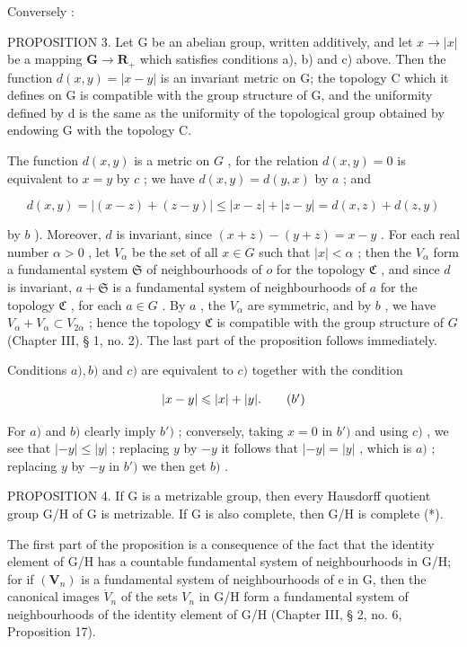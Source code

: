 Conversely :

PROPOSITION 3. Let G be an abelian group, written additively, and let \(x \to |x|\) be a mapping \(\mathbf{G} \to \mathbf{R}_+\) which satisfies conditions a), b) and c) above. Then the function \(d(x, y) = |x - y|\) is an invariant metric on G; the topology C which it defines on G is compatible with the group structure of G, and the uniformity defined by d is the same as the uniformity of the topological group obtained by endowing G with the topology C.

The function \(d(x, y)\) is a metric on \(G\) , for the relation \(d(x, y) = 0\) is equivalent to \(x = y\) by \(c\) ; we have \(d(x, y) = d(y, x)\) by \(a\) ; and

\[
d (x, y) = | (x - z) + (z - y) | \leqslant | x - z | + | z - y | = d (x, z) + d (z, y)
\]

by \(b\) ). Moreover, \(d\) is invariant, since \((x + z) - (y + z) = x - y\) . For each real number \(\alpha > 0\) , let \(V_{\alpha}\) be the set of all \(x \in G\) such that \(|x| < \alpha\) ; then the \(V_{\alpha}\) form a fundamental system \(\mathfrak{S}\) of neighbourhoods of \(o\) for the topology \(\mathfrak{C}\) , and since \(d\) is invariant, \(a + \mathfrak{S}\) is a fundamental system of neighbourhoods of \(a\) for the topology \(\mathfrak{C}\) , for each \(a \in G\) . By \(a\) , the \(V_{\alpha}\) are symmetric, and by \(b\) , we have \(V_{\alpha} + V_{\alpha} \subset V_{2\alpha}\) ; hence the topology \(\mathfrak{C}\) is compatible with the group structure of \(G\) (Chapter III, § 1, no. 2). The last part of the proposition follows immediately.

Conditions \(a), b)\) and \(c)\) are equivalent to \(c)\) together with the condition

\[
| x - y | \leqslant | x | + | y |.\tag{\(b^{\prime}\)}
\]

For \(a)\) and \(b)\) clearly imply \(b')\) ; conversely, taking \(x = 0\) in \(b')\) and using \(c)\) , we see that \(|-y| \leqslant |y|\) ; replacing \(y\) by \(-y\) it follows that \(|-y| = |y|\) , which is \(a)\) ; replacing \(y\) by \(-y\) in \(b')\) we then get \(b)\) .

PROPOSITION 4. If G is a metrizable group, then every Hausdorff quotient group G/H of G is metrizable. If G is also complete, then G/H is complete (*).

The first part of the proposition is a consequence of the fact that the identity element of G/H has a countable fundamental system of neighbourhoods in G/H; for if \((\mathbf{V}_{n})\) is a fundamental system of neighbourhoods of e in G, then the canonical images \(\dot{V}_{n}\) of the sets \(V_{n}\) in G/H form a fundamental system of neighbourhoods of the identity element of G/H (Chapter III, § 2, no. 6, Proposition 17).

